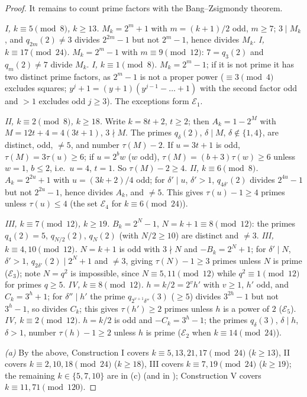 \documentclass[11pt]{amsart}
\theoremstyle{definition}
\theoremstyle{remark}
\begin{document}
\begin{proof}
It remains to count prime factors with the Bang--Zsigmondy theorem.

\emph{I, $k\equiv5\pmod8$, $k\ge13$.} $M_k=2^m+1$ with $m=(k+1)/2$ odd, $m\ge7$; $3\mid M_k$, and
$q_{2m}(2)\ne3$ divides $2^{2m}-1$ but not $2^m-1$, hence divides $M_k$.
\emph{I, $k\equiv17\pmod{24}$.} $M_k=2^m-1$ with $m\equiv9\pmod{12}$: $7=q_3(2)$ and $q_m(2)\ne7$
divide $M_k$.
\emph{I, $k\equiv1\pmod 8$.} $M_k=2^m-1$; if it is not prime it has two distinct prime factors, as
$2^m-1$ is not a proper power ($\equiv3\pmod4$ excludes squares; $y^j+1=(y+1)(y^{j-1}-\dots+1)$ with
the second factor odd and $>1$ excludes odd $j\ge3$). The exceptions form $\mathcal E_1$.

\emph{II, $k\equiv2\pmod8$, $k\ge18$.} Write $k=8t+2$, $t\ge2$; then $A_k=1-2^M$ with
$M=12t+4=4(3t+1)$, $3\nmid M$. The primes $q_\delta(2)$, $\delta\mid M$, $\delta\notin\{1,4\}$, are
distinct, odd, $\ne5$, and number $\tau(M)-2$. If $u=3t+1$ is odd, $\tau(M)=3\tau(u)\ge6$; if
$u=2^bw$ ($w$ odd), $\tau(M)=(b+3)\tau(w)\ge6$ unless $w=1$, $b\le2$, i.e.\ $u=4$, $t=1$. So
$\tau(M)-2\ge4$.
\emph{II, $k\equiv6\pmod8$.} $A_k=2^{2u}+1$ with $u=(3k+2)/4$ odd; for $\delta'\mid u$, $\delta'>1$,
$q_{4\delta'}(2)$ divides $2^{4u}-1$ but not $2^{2u}-1$, hence divides $A_k$, and $\ne5$. This gives
$\tau(u)-1\ge4$ primes unless $\tau(u)\le4$ (the set $\mathcal E_4$ for $k\equiv6\pmod{24}$).

\emph{III, $k\equiv7\pmod{12}$, $k\ge19$.} $B_k=2^N-1$, $N=k+1\equiv8\pmod{12}$: the primes
$q_4(2)=5$, $q_{N/2}(2)$, $q_N(2)$ (with $N/2\ge10$) are distinct and $\ne3$.
\emph{III, $k\equiv4,10\pmod{12}$.} $N=k+1$ is odd with $3\nmid N$ and $-B_k=2^N+1$; for $\delta'\mid N$,
$\delta'>1$, $q_{2\delta'}(2)\mid 2^N+1$ and $\ne3$, giving $\tau(N)-1\ge3$ primes unless $N$ is
prime ($\mathcal E_3$); note $N=q^2$ is impossible, since $N\equiv5,11\pmod{12}$ while $q^2\equiv1\pmod{12}$
for primes $q\ge5$.
\emph{IV, $k\equiv8\pmod{12}$.} $h=k/2=2^vh'$ with $v\ge1$, $h'$ odd, and $C_k=3^h+1$; for
$\delta''\mid h'$ the prime $q_{2^{v+1}\delta''}(3)$ ($\ge5$) divides $3^{2h}-1$ but not $3^h-1$, so
divides $C_k$; this gives $\tau(h')\ge2$ primes unless $h$ is a power of $2$ ($\mathcal E_5$).
\emph{IV, $k\equiv2\pmod{12}$.} $h=k/2$ is odd and $-C_k=3^h-1$; the primes $q_\delta(3)$,
$\delta\mid h$, $\delta>1$, number $\tau(h)-1\ge2$ unless $h$ is prime ($\mathcal E_2$ when
$k\equiv14\pmod{24}$).

\emph{(a)} By the above, Construction I covers $k\equiv5,13,21,17\pmod{24}$ ($k\ge13$), II covers
$k\equiv2,10,18\pmod{24}$ ($k\ge18$), III covers $k\equiv7,19\pmod{24}$ ($k\ge19$); the remaining
$k\in\{5,7,10\}$ are in (c) (and in \cite{R6-Siurys}); Construction V covers $k\equiv11,71\pmod{120}$.


\end{proof}
\end{document}
